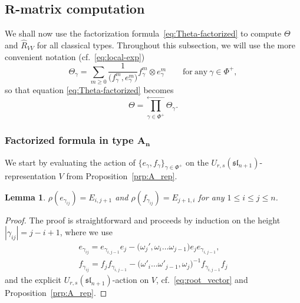 \documentclass[pdftex]{sigma}
\numberwithin{equation}{section}
\newtheorem{Lemma}[Theorem]{Lemma}
\newcommand{\ssl}{\mathfrak{sl}}
\begin{document}
\subsection[R-matrix computation]{$\boldsymbol{R}$-matrix computation}\label{ssec:R-Matrix-Computation}

We shall now use the factorization formula~\eqref{eq:Theta-factorized} to compute $\Theta$ and $\hat{R}_{VV}$ for all classical types.
Throughout this subsection, we will use the more convenient notation (cf.\ \eqref{eq:local-exp})
\begin{equation}\label{eq:local-Theta}
 \Theta_{\gamma} = \sum_{m \ge 0}\frac{1}{\bigl(f_{\gamma}^{m},e_{\gamma}^{m}\bigr)}f_{\gamma}^{m} \otimes e_{\gamma}^{m}
 \qquad \mathrm{for\ any} \ \gamma \in \Phi^{+},
\end{equation}
so that equation \eqref{eq:Theta-factorized} becomes
\begin{displaymath}
 \Theta = \overset{\longleftarrow}{\underset{\gamma \in \Phi^{+}}{\prod}}\Theta_{\gamma}.
\end{displaymath}

\subsubsection[Factorized formula in type A\_n]{Factorized formula in type $\boldsymbol{A_{n}}$}

We start by evaluating the action of $\{e_\gamma,f_\gamma\}_{\gamma\in \Phi^+}$ on the $U_{r,s}(\ssl_{n+1})$-representation $V$ from Proposition~\ref{prp:A_rep}.

\begin{Lemma}
$\rho(e_{\gamma_{ij}}) = E_{i,j + 1}$ and $\rho(f_{\gamma_{ij}}) = E_{j + 1,i}$ for any $1\leq i\leq j\leq n$.
\end{Lemma}

\begin{proof}
The proof is straightforward and proceeds by induction on the height $|\gamma_{ij}|=j-i+1$, where we use
\begin{gather*}
 e_{\gamma_{ij}}=e_{\gamma_{i,j-1}}e_{j} - \bigl(\omega_j',\omega_i \dots \omega_{j-1}\bigr) e_{j}e_{\gamma_{i,j-1}},\\
 f_{\gamma_{ij}} = f_{j}f_{\gamma_{i,j-1}}  - \bigl(\omega'_i\dots \omega'_{j-1},\omega_j\bigr)^{-1} f_{\gamma_{i,j-1}}f_{j}
\end{gather*}
and the explicit $U_{r,s}(\ssl_{n+1})$-action on $V$, cf.\ \eqref{eq:root_vector} and Proposition~\ref{prp:A_rep}.
\end{proof}
\end{document}
